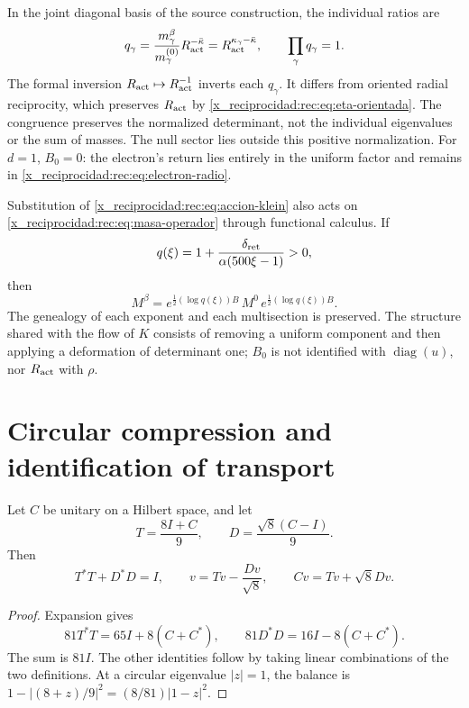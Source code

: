 In the joint diagonal basis of the source construction, the individual ratios are
\[
 q_\gamma=\frac{m_\gamma^\beta}{m_\gamma^{(0)}}R_{\rm act}^{-\bar\kappa}
 =R_{\rm act}^{\kappa_\gamma-\bar\kappa},\qquad
 \prod_\gamma q_\gamma=1.
\]
The formal inversion \(R_{\rm act}\mapsto R_{\rm act}^{-1}\) inverts each \(q_\gamma\). It differs from oriented radial reciprocity, which preserves \(R_{\rm act}\) by \eqref{x_reciprocidad:rec:eq:eta-orientada}. The congruence preserves the normalized determinant, not the individual eigenvalues or the sum of masses. The null sector lies outside this positive normalization. For \(d=1\), \(B_0=0\): the electron's return lies entirely in the uniform factor and remains in \eqref{x_reciprocidad:rec:eq:electron-radio}.

Substitution of \eqref{x_reciprocidad:rec:eq:accion-klein} also acts on \eqref{x_reciprocidad:rec:eq:masa-operador} through functional calculus. If
\[
 q(\xi)=1+\frac{\delta_{\rm ret}}{\alpha(500\xi-1)}>0,
\]
then
\[
 M^\beta=e^{\frac12(\log q(\xi))B}\,M^0\,
          e^{\frac12(\log q(\xi))B}.
\]
The genealogy of each exponent and each multisection is preserved. The structure shared with the flow of \(K\) consists of removing a uniform component and then applying a deformation of determinant one; \(B_0\) is not identified with \(\operatorname{diag}(u)\), nor \(R_{\rm act}\) with \(\rho\).

\section{Circular compression and identification of transport}

\begin{theorem}
\label{x_reciprocidad:rec:thm:operador}
Let \(C\) be unitary on a Hilbert space, and let
\[
 T=\frac{8I+C}{9},\qquad D=\frac{\sqrt8(C-I)}9.
\]
Then
\begin{equation}
 T^*T+D^*D=I,\qquad
 v=Tv-\frac{Dv}{\sqrt8},\qquad Cv=Tv+\sqrt8Dv.
 \label{x_reciprocidad:rec:eq:unitario}
\end{equation}
\end{theorem}
\begin{proof}
Expansion gives
\[
 81T^*T=65I+8(C+C^*),\qquad
 81D^*D=16I-8(C+C^*).
\]
The sum is \(81I\). The other identities follow by taking linear combinations of the two definitions. At a circular eigenvalue \(|z|=1\), the balance is
\(1-|(8+z)/9|^2=(8/81)|1-z|^2\).
\end{proof}

